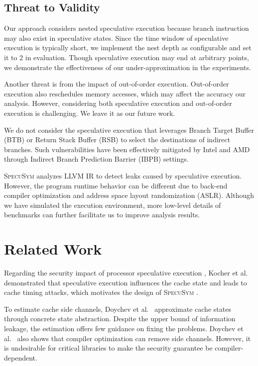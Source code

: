 \documentclass[sigconf]{acmart}
\newcommand{\SpecuSym}{\textsc{SpecuSym} }
\begin{document}
\subsection{Threat to Validity}
\label{sec:threat}
Our approach considers nested speculative execution because branch 
instruction may also exist in speculative states. Since the time window 
of speculative execution is typically short, we implement the nest depth 
as configurable and set it to 2 in evaluation. Though speculative execution 
may end at arbitrary points, we demonstrate the effectiveness of our
under-approximation in the experiments. 

Another threat is from the impact 
of out-of-order execution. Out-of-order execution also reschedules memory 
accesses, which may affect the accuracy our analysis. However, considering 
both speculative execution and out-of-order execution is challenging. We 
leave it as our future work. 

We do not consider the speculative execution 
that leverages Branch Target Buffer (BTB) or Return Stack Buffer (RSB) to 
select the destinations of indirect branches. Such vulnerabilities have 
been effectively mitigated by Intel and AMD through Indirect Branch 
Prediction Barrier (IBPB) settings.

\SpecuSym analyzes LLVM IR to detect leaks caused by speculative execution. 
However, the program runtime behavior can be different due to back-end 
compiler optimization and address space layout randomization (ASLR). 
Although we have simulated the execution environment, more low-level 
details of benchmarks can further facilitate us to improve analysis 
results.



\section{Related Work}
\label{sec:related}

Regarding the security impact of processor speculative execution
\cite{kimuraKT1996}, Kocher et al.~\cite{KocherGGHHLMPSY19} demonstrated 
that speculative execution influences the cache state and leads to cache 
timing attacks, which motivates the design of \SpecuSym. 

To estimate cache side channels, Doychev et al.~\cite{DoychevFKMR13}
approximate cache states through concrete state abstraction. Despite the
upper bound of information leakage, the estimation offers few guidance on 
fixing the problems. Doychev et al.~\cite{DoychevK17} also shows that 
compiler optimization can remove side channels. However, it is undesirable 
for critical libraries to make the security guarantee be compiler-dependent. 
\end{document}
